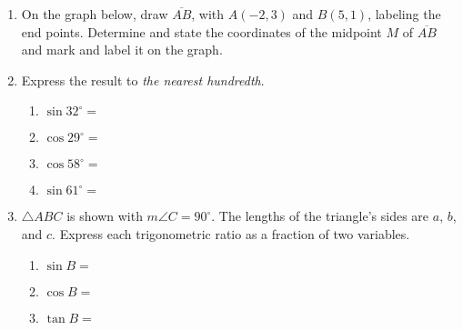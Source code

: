 \documentclass[12pt, twoside]{article}
\begin{document}
\begin{enumerate}
\newpage
  \item On the graph below, draw $\overline{AB}$, with $A(-2,3)$ and $B(5,1)$, labeling the end points. Determine and state the coordinates of the midpoint $M$ of $\overline{AB}$ and mark and label it on the graph.\\
    \vspace{2cm}

  \item Express the result to \emph{the nearest hundredth}.  \vspace{0.5cm}
    \begin{multicols}{2}
      \begin{enumerate}
        \item $\sin 32^\circ = $ \vspace{0.5cm}
        \item $\cos 29^\circ =$
        \item $\cos 58^\circ = $ \vspace{0.5cm}
        \item $\sin 61^\circ =$
      \end{enumerate}
    \end{multicols}

  \item $\triangle ABC$ is shown with $m\angle C=90^\circ$. The lengths of the triangle's sides are $a$, $b$, and $c$. Express each trigonometric ratio as a fraction of two variables. \vspace{1cm}
  \begin{multicols}{2}

        \begin{enumerate}
        \item $\sin B =$ \vspace{0.75cm}
        \item $\cos B =$ \vspace{0.75cm}
        \item $\tan B =$ \vspace{0.75cm}
      \end{enumerate}
  \end{multicols}


\end{enumerate}
\end{document}
